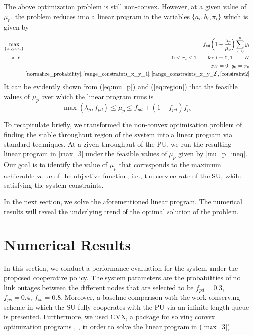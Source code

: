 \documentclass[conference]{IEEEtran}
\begin{document}
The above optimization problem is still non-convex. However, at a given
value of $\mu_p$, the problem reduces into a linear program
in the variables $\{a_i, b_i, \pi_i\}$ which is given by
\begin{eqnarray}
\max_{\{x_i, y_i, \pi_i\}} \!\!&&\!\! f_{sd} \left( 1 -
\frac{\lambda_p}{\mu_p}
\right) \displaystyle\sum_{i=0}^K y_i \nonumber \\
  \text{s. t. } \!\!&&\!\!   0 \leq \pi_i \leq 1 \qquad \text{for } i=0,1,\ldots, K  \nonumber \\
  \!\!&& \!\!  x_K=0,\: y_0=\pi_0   \nonumber\\
  \!\!&& \!\!
   \eqref{normalize_probability},\eqref{range_constraints_x_y_1},\eqref{range_constraints_x_y_2},\eqref{constraint2}
  \label{max_3}
  \end{eqnarray}
It can be evidently shown from (\ref{eq:mu_p}) and (\ref{eq:region}) that
the feasible values of $\mu_p$ over which the linear program runs is
\begin{equation} \label{mu_p_ineq}
\max(\lambda_p,f_{pd}) \leq \mu_p \leq f_{pd}+\left(1-f_{pd}\right)f_{ps}
\end{equation}

To recapitulate briefly, we transformed the non-convex optimization problem
of finding the stable throughput region of the system
into a linear program via standard techniques. At a given throughput of the
PU, we run the resulting linear program in \eqref{max_3} under the feasible
values of $\mu_p$ given by \eqref{mu_p_ineq}. Our goal is to
identify the value of $\mu_p$ that corresponds to the maximum achievable
value of the objective function, i.e., the service rate of the SU,
while satisfying the system constraints.










In the next section, we solve the aforementioned
linear program. The numerical results will reveal the underlying
trend of the optimal solution of the problem.




\section{Numerical Results}
In this section, we conduct a performance evaluation for the system under the proposed cooperative policy. The system parameters are the probabilities of no link outages between the different nodes that are selected to be $f_{pd}=0.3$, $f_{ps}=0.4$, $f_{sd}=0.8$. Moreover, a baseline comparison with the work-conserving scheme in which the SU fully cooperates with the PU via an infinite length queue \cite{R_CoopAcc} is presented. Furthermore, we used CVX, a package for solving convex optimization programs \cite{cvx}, \cite{gb08}, in order to solve the linear program in (\ref{max_3}).
\end{document}
